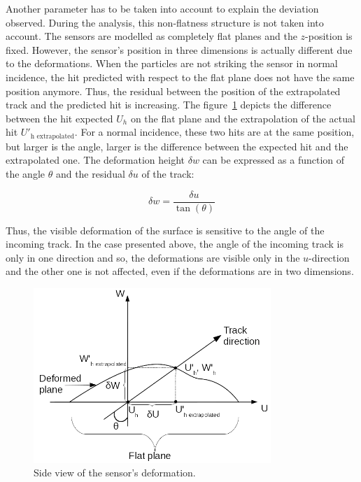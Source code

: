       Another parameter has to be taken into account to explain the deviation observed.
      During the analysis, this non-flatness structure is not taken into account.
      The sensors are modelled as completely flat planes and the $z$-position is fixed.
      However, the sensor's position in three dimensions is actually different due to the deformations.
      When the particles are not striking the sensor in normal incidence, the hit predicted with respect to the flat plane does not have the same position anymore.
      Thus, the residual between the position of the extrapolated track and the predicted hit is increasing.
      The figure~\ref{fig:originDef} depicts the difference between the hit expected $U_{h}$ on the flat plane and the extrapolation of the actual hit $U'_{\text{h extrapolated}}$.
      For a normal incidence, these two hits are at the same position, but larger is the angle, larger is the difference between the expected hit and the extrapolated one.
      The deformation height $\delta w$ can be expressed as a function of the angle $\theta$ and the residual $\delta u$ of the track:

      \begin{equation}
        \delta w = \frac{\delta u}{\tan(\theta)}
        \label{eq:deltaW}
      \end{equation}

      Thus, the visible deformation of the surface is sensitive to the angle of the incoming track.
      In the case presented above, the angle of the incoming track is only in one direction and so, the deformations are visible only in the $u$-direction and the other one is not affected, even if the deformations are in two dimensions.

      \begin{figure}[!h]
      \centering
        \includegraphics[width = 0.8\textwidth]{Pictures/deformation/origin_deformation.png}
        \caption{Side view of the sensor's deformation.}
        \label{fig:originDef}
      \end{figure}

